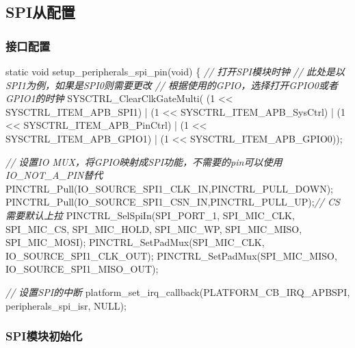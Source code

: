 \documentclass[
  12pt,
]{book}
\newenvironment{Shaded}{\begin{snugshade}}{\end{snugshade}}
\newcommand{\CommentTok}[1]{\textcolor[rgb]{0.56,0.35,0.01}{\textit{#1}}}
\newcommand{\DataTypeTok}[1]{\textcolor[rgb]{0.13,0.29,0.53}{#1}}
\newcommand{\DecValTok}[1]{\textcolor[rgb]{0.00,0.00,0.81}{#1}}
\newcommand{\NormalTok}[1]{#1}
\begin{document}
\hypertarget{spiux4eceux914dux7f6e-1}{%
\subsection{SPI从配置}\label{spiux4eceux914dux7f6e-1}}

\hypertarget{ux63a5ux53e3ux914dux7f6e-3}{%
\subsubsection{接口配置}\label{ux63a5ux53e3ux914dux7f6e-3}}

\begin{Shaded}
\begin{Highlighting}[]
\DataTypeTok{static} \DataTypeTok{void}\NormalTok{ setup_peripherals_spi_pin(}\DataTypeTok{void}\NormalTok{)}
\NormalTok{\{}
    \CommentTok{// 打开SPI模块时钟}
    \CommentTok{// 此处是以SPI1为例，如果是SPI0则需要更改}
    \CommentTok{// 根据使用的GPIO，选择打开GPIO0或者GPIO1的时钟}
\NormalTok{    SYSCTRL_ClearClkGateMulti(    (}\DecValTok{1}\NormalTok{ << SYSCTRL_ITEM_APB_SPI1)}
\NormalTok{                                | (}\DecValTok{1}\NormalTok{ << SYSCTRL_ITEM_APB_SysCtrl)}
\NormalTok{                                | (}\DecValTok{1}\NormalTok{ << SYSCTRL_ITEM_APB_PinCtrl)}
\NormalTok{                                | (}\DecValTok{1}\NormalTok{ << SYSCTRL_ITEM_APB_GPIO1)}
\NormalTok{                                | (}\DecValTok{1}\NormalTok{ << SYSCTRL_ITEM_APB_GPIO0));}

    \CommentTok{// 设置IO MUX，将GPIO映射成SPI功能，不需要的pin可以使用IO_NOT_A_PIN替代}
\NormalTok{    PINCTRL_Pull(IO_SOURCE_SPI1_CLK_IN,PINCTRL_PULL_DOWN);}
\NormalTok{    PINCTRL_Pull(IO_SOURCE_SPI1_CSN_IN,PINCTRL_PULL_UP);}\CommentTok{// CS 需要默认上拉}
\NormalTok{    PINCTRL_SelSpiIn(SPI_PORT_1, SPI_MIC_CLK, SPI_MIC_CS, SPI_MIC_HOLD, SPI_MIC_WP, SPI_MIC_MISO, SPI_MIC_MOSI);}
\NormalTok{    PINCTRL_SetPadMux(SPI_MIC_CLK, IO_SOURCE_SPI1_CLK_OUT);}
\NormalTok{    PINCTRL_SetPadMux(SPI_MIC_MISO, IO_SOURCE_SPI1_MISO_OUT);}
    
    \CommentTok{// 设置SPI的中断}
\NormalTok{    platform_set_irq_callback(PLATFORM_CB_IRQ_APBSPI, peripherals_spi_isr, NULL);}
\end{Highlighting}
\end{Shaded}

\hypertarget{spiux6a21ux5757ux521dux59cbux5316-3}{%
\subsubsection{SPI模块初始化}\label{spiux6a21ux5757ux521dux59cbux5316-3}}
\end{document}
